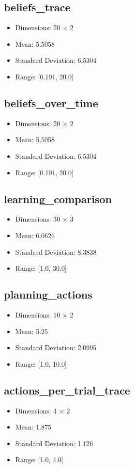 \documentclass{article}
\begin{document}
\subsection{beliefs_trace}
\begin{itemize}
\item Dimensions: 20 × 2
\item Mean: 5.5058
\item Standard Deviation: 6.5304
\item Range: [0.191, 20.0]
\end{itemize}

\subsection{beliefs_over_time}
\begin{itemize}
\item Dimensions: 20 × 2
\item Mean: 5.5058
\item Standard Deviation: 6.5304
\item Range: [0.191, 20.0]
\end{itemize}

\subsection{learning_comparison}
\begin{itemize}
\item Dimensions: 30 × 3
\item Mean: 6.0626
\item Standard Deviation: 8.3838
\item Range: [1.0, 30.0]
\end{itemize}

\subsection{planning_actions}
\begin{itemize}
\item Dimensions: 10 × 2
\item Mean: 5.25
\item Standard Deviation: 2.0995
\item Range: [1.0, 10.0]
\end{itemize}

\subsection{actions_per_trial_trace}
\begin{itemize}
\item Dimensions: 4 × 2
\item Mean: 1.875
\item Standard Deviation: 1.126
\item Range: [1.0, 4.0]
\end{itemize}
\end{document}
